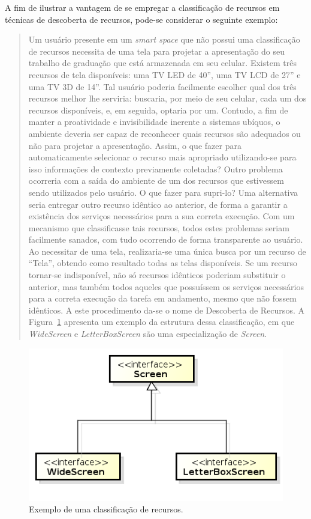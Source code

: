 A fim de ilustrar a vantagem de se empregar a classificação de recursos em técnicas de descoberta de recursos, pode-se considerar o seguinte exemplo:

\begin{quote}
	Um usuário presente em um \emph{smart space} que não possui uma classificação de recursos necessita de uma tela para projetar a apresentação do seu trabalho de graduação que está armazenada em seu celular. Existem três recursos de tela disponíveis: uma TV LED de 40'', uma TV LCD de 27'' e uma TV 3D de 14''. Tal usuário poderia facilmente escolher qual dos três recursos melhor lhe serviria: buscaria, por meio de seu celular, cada um dos recursos disponíveis, e, em seguida, optaria por um. Contudo, a fim de manter a proatividade e invisibilidade inerente a sistemas ubíquos, o ambiente deveria ser capaz de reconhecer quais recursos são adequados ou não para projetar a apresentação. Assim, o que fazer para automaticamente selecionar o recurso mais apropriado utilizando-se para isso informações de contexto previamente coletadas? Outro problema ocorreria com a saída do ambiente de um dos recursos que estivessem sendo utilizados pelo usuário. O que fazer para supri-lo? Uma alternativa seria entregar outro recurso idêntico ao anterior, de forma a garantir a existência dos serviços necessários para a sua correta execução. Com um mecanismo que classificasse tais recursos, todos estes problemas seriam facilmente sanados, com tudo ocorrendo de forma transparente ao usuário. Ao necessitar de uma tela, realizaria-se uma única busca por um recurso de ``Tela'', obtendo como resultado todas as telas disponíveis. Se um recurso tornar-se indisponível, não só recursos idênticos poderiam substituir o anterior, mas também todos aqueles que possuíssem os serviços necessários para a correta execução da tarefa em andamento, mesmo que não fossem idênticos. A este procedimento da-se o nome de Descoberta de Recursos. A Figura~\ref{fig:arvoreDeEquivalencia} apresenta um exemplo da estrutura dessa classificação, em que \emph{WideScreen} e \emph{LetterBoxScreen} são uma especialização de \emph{Screen}.
\end{quote}

\begin{figure}[ht]
	\center
	\includegraphics[scale=0.9]{imagens/screenTree}
	\caption{Exemplo de uma classificação de recursos.}
	\label{fig:arvoreDeEquivalencia}
\end{figure}

